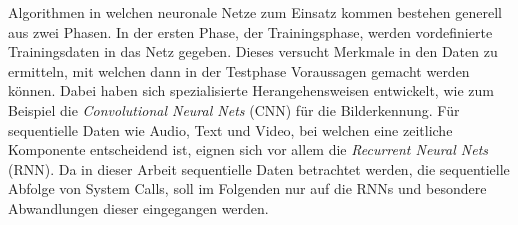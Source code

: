         Algorithmen in welchen neuronale Netze zum Einsatz kommen bestehen generell aus zwei Phasen. 
        In der ersten Phase, der Trainingsphase, werden vordefinierte Trainingsdaten in das Netz gegeben.
        Dieses versucht Merkmale in den Daten zu ermitteln, mit welchen dann in der Testphase Voraussagen gemacht werden können.
        Dabei haben sich spezialisierte Herangehensweisen entwickelt, wie zum Beispiel die \textit{Convolutional Neural Nets} (CNN) für die Bilderkennung. 
        Für sequentielle Daten wie Audio, Text und Video, bei welchen eine zeitliche Komponente entscheidend ist, eignen sich vor allem die \textit{Recurrent Neural Nets} (RNN).
        Da in dieser Arbeit sequentielle Daten betrachtet werden, die sequentielle Abfolge von System Calls, soll im Folgenden nur auf die RNNs und besondere Abwandlungen dieser eingegangen werden.
